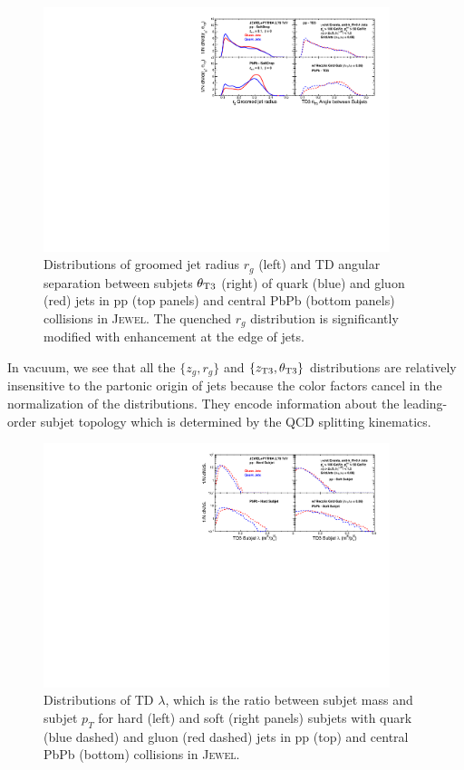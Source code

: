 \documentclass[notoc,preprintnumbers]{JHEP3}
\begin{document}
\begin{figure}[t]
	   \centering
	   \includegraphics[width=0.9\textwidth]{plots/Comp_rg_new.pdf}
	   \caption{Distributions of groomed jet radius $r_g$ (left) and TD angular separation between subjets $\theta_{\rm T3}$ (right) of quark (blue) and gluon (red) jets in pp (top panels) and central PbPb (bottom panels) collisions in \textsc{Jewel}. The quenched $r_{g}$ distribution is significantly modified with enhancement at the edge of jets.}
\label{fig:comp_rg}
\end{figure}

In vacuum, we see that all the $\{z_g,r_g\}$ and $\{z_{\rm T3},\theta_{\rm T3}\}$ distributions are relatively insensitive to the partonic origin of jets because the color factors cancel in the normalization of the distributions. They encode information about the leading-order subjet topology which is determined by the QCD splitting kinematics. 

\begin{figure}[t]
	   \centering
	   \includegraphics[width=0.9\textwidth]{plots/Comp_lambda_new.pdf}
	   \caption{Distributions of TD $\lambda$, which is the ratio between subjet mass and subjet $p_T$ for hard (left) and soft (right panels) subjets with quark (blue dashed) and gluon (red dashed) jets in pp (top) and central PbPb (bottom) collisions in \textsc{Jewel}. }
\label{fig:comp_subjet_m}
\end{figure}
\end{document}
